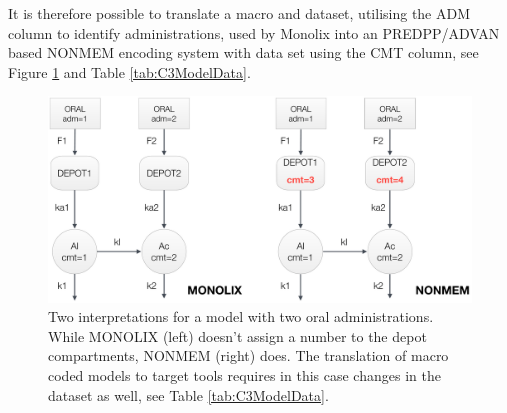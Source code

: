 It is therefore possible to translate a macro and dataset, utilising the ADM column to identify 
administrations, used by Monolix into an PREDPP/ADVAN based NONMEM encoding 
system with data set using the CMT column, see Figure \ref{fig:ComplexModel_Rules} and
Table \ref{tab:C3ModelData}.


\begin{figure}[h!]
\centering
 \includegraphics[width=140mm]{pics/ComplexModel_Rules.pdf}
\caption{Two interpretations for a model with two oral administrations.
While MONOLIX (left) doesn't assign a number to the depot compartments, 
NONMEM (right) does. The translation of macro coded models to target tools 
requires in this case changes in the dataset as well, see Table \ref{tab:C3ModelData}.}
\label{fig:ComplexModel_Rules}
\end{figure}



